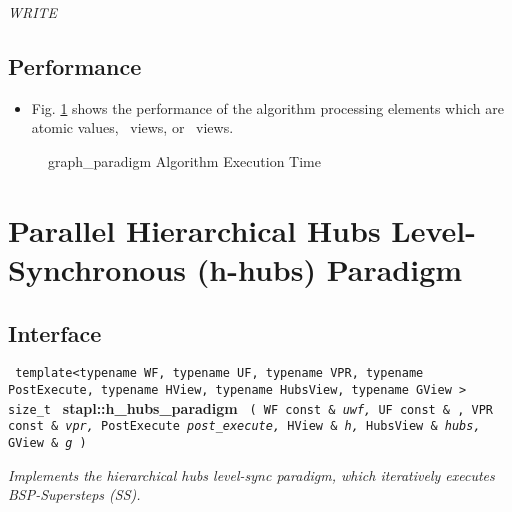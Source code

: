 \textit{WRITE}

\subsection{Performance} \label{sec-graf-para-alg-perf}

\begin{itemize}
\item
Fig. \ref{fig:graf-para-alg-exec-exper}
shows the performance of the algorithm processing
elements which are atomic values, \stl\ views, or \stapl\ views.
\end{itemize}

\begin{figure}[p]
\caption{ graph\_paradigm Algorithm Execution Time}
\label{fig:graf-para-alg-exec-exper}
\end{figure}


\section{ Parallel Hierarchical Hubs Level-Synchronous (h-hubs) Paradigm}
\label{sec-hubs-para-alg}

\subsection{Interface} \label{sec-hubs-para-alg-inter}

\noindent
\texttt{%
template<typename WF, typename UF, typename VPR, 
\newline
typename PostExecute, typename HView, typename HubsView, typename GView >
\newline
size\_t 
}
\newline
\textbf{stapl::h\_hubs\_paradigm}%
\newline
\texttt{%
(
WF const \&
\textit{uwf,}%
UF const \& ,
VPR const \&
\textit{vpr,}%
PostExecute
\textit{post\_execute,}%
HView \&
\textit{h,}%
HubsView \&
\textit{hubs,}%
GView \&
\textit{g}%
)     
}
\vspace{0.4cm}

\textit{
Implements the hierarchical hubs level-sync paradigm, which iteratively executes BSP-Supersteps (SS). 
}
\vspace{0.4cm}

